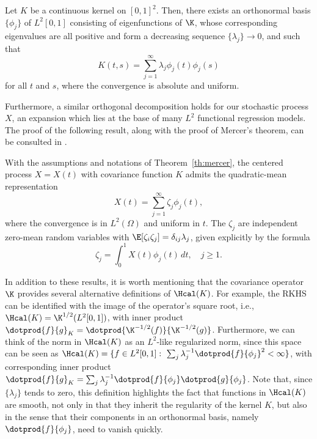 \begin{theorem}\label{th:mercer}
    Let \(K\) be a continuous kernel on \([0,1]^2\). Then, there exists an orthonormal basis \(\{\phi_j\}\) of \(L^2[0,1]\) consisting of eigenfunctions of \(\K\), whose corresponding eigenvalues are all positive and form a decreasing sequence \(\{\lambda_j\}\to 0\), and such that
    \[
      K(t, s) = \sum_{j=1}^\infty \lambda_j \phi_j(t)\phi_j(s)
    \]
    for all \(t\) and \(s\), where the convergence is absolute and uniform.
\end{theorem}

Furthermore, a similar orthogonal decomposition holds for our stochastic process \(X\), an expansion which lies at the base of many \(L^2\) functional regression models. The proof of the following result, along with the proof of Mercer's theorem, can be consulted in \citet[][Ch.~3.2]{berlinet2004reproducing}.

\begin{theorem}
  With the assumptions and notations of Theorem~\eqref{th:mercer}, the centered process \(X=X(t)\) with covariance function \(K\) admits the quadratic-mean representation
  \[
  X(t) = \sum_{j=1}^\infty \zeta_j \phi_j(t),
  \]
  where the convergence is in \(L^2(\Omega)\) and uniform in \(t\). The \(\zeta_j\) are independent zero-mean random variables with \(\E[\zeta_i\zeta_j]=\delta_{ij}\lambda_j\), given explicitly by the formula
  \[
    \zeta_j = \int_0^1 X(t)\phi_j(t)\, dt, \quad j\geq 1.
  \]
\end{theorem}

In addition to these results, it is worth mentioning that the covariance operator \(\K\) provides several alternative definitions of \(\Hcal(K)\). For example, the RKHS can be identified with the image of the operator's square root, i.e., \(\Hcal(K) = \K^{1/2}(L^2[0, 1])\), with inner product \(\dotprod{f}{g}_K = \dotprod{\K^{-1/2}(f)}{\K^{-1/2}(g)}\). Furthermore, we can think of the norm in \(\Hcal(K)\) as an \(L^2\)-like regularized norm, since this space can be seen as \(\Hcal(K) = \{f \in L^2[0, 1]: \ \sum_j \lambda_j^{-1}\dotprod{f}{\phi_j}^2 < \infty \}\), with corresponding inner product \(\dotprod{f}{g}_K = \sum_j \lambda_j^{-1}\dotprod{f}{\phi_j}\dotprod{g}{\phi_j}\). Note that, since \(\{\lambda_j\}\) tends to zero, this definition highlights the fact that functions in \(\Hcal(K)\) are smooth, not only in that they inherit the regularity of the kernel \(K\), but also in the sense that their components in an orthonormal basis, namely \(\dotprod{f}{\phi_j}\), need to vanish quickly.

